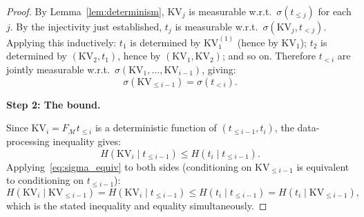 \documentclass[10pt,a4paper]{amsart}
\begin{document}
\begin{proof}
By Lemma~\ref{lem:determinism}, $\mathrm{KV}_j$ is measurable w.r.t.\ $\sigma(t_{\leq j})$
for each $j$.  By the injectivity just established, $t_j$ is measurable w.r.t.\
$\sigma(\mathrm{KV}_j, t_{<j})$.  Applying this inductively:
$t_1$ is determined by $\mathrm{KV}_1^{(1)}$ (hence by $\mathrm{KV}_1$);
$t_2$ is determined by $(\mathrm{KV}_2, t_1)$, hence by $(\mathrm{KV}_1, \mathrm{KV}_2)$;
and so on.
Therefore $t_{<i}$ are jointly measurable w.r.t.\
$\sigma(\mathrm{KV}_1,\ldots,\mathrm{KV}_{i-1})$, giving:
\begin{equation}
  \sigma(\mathrm{KV}_{\leq i-1}) = \sigma(t_{<i}).
  \label{eq:sigma_equiv}
\end{equation}

\textbf{Step 2: The bound.}

Since $\mathrm{KV}_i = F_{\mathcal{M}}t_{\leq i}$ is a deterministic function
of $(t_{\leq i-1}, t_i)$, the data-processing inequality gives:
\[
  H(\mathrm{KV}_i \mid t_{\leq i-1}) \leq H(t_i \mid t_{\leq i-1}).
\]
Applying~\eqref{eq:sigma_equiv} to both sides (conditioning on $\mathrm{KV}_{\leq i-1}$
is equivalent to conditioning on $t_{\leq i-1}$):
\[
  H(\mathrm{KV}_i \mid \mathrm{KV}_{\leq i-1})
  = H(\mathrm{KV}_i \mid t_{\leq i-1})
  \leq H(t_i \mid t_{\leq i-1})
  = H(t_i \mid \mathrm{KV}_{\leq i-1}),
\]
which is the stated inequality and equality simultaneously.
\end{proof}
\end{document}
